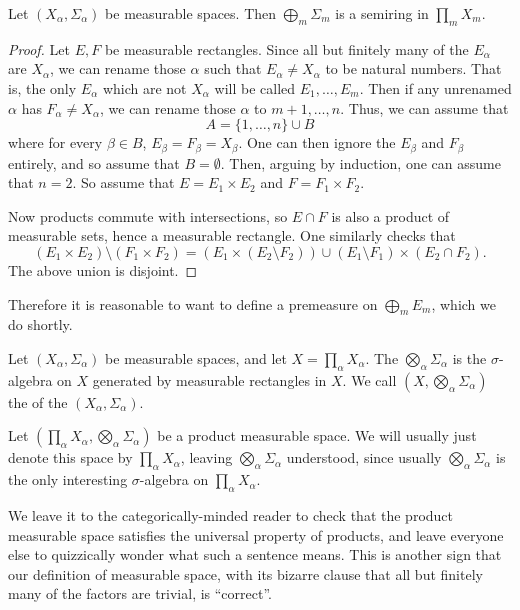 \begin{lemma}
Let $(X_\alpha, \Sigma_\alpha)$ be measurable spaces.
Then $\bigoplus_{m} \Sigma_{m}$ is a semiring in $\prod_{m} X_{m}$.
\end{lemma}
\begin{proof}
Let $E, F$ be measurable rectangles.
Since all but finitely many of the $E_\alpha$ are $X_\alpha$, we can rename those $\alpha$ such that $E_{\alpha} \neq X_\alpha$ to be natural numbers.
That is, the only $E_\alpha$ which are not $X_\alpha$ will be called $E_1, \dots, E_{m}$.
Then if any unrenamed $\alpha$ has $F_{\alpha} \neq X_\alpha$, we can rename those $\alpha$ to $m+1, \dots, n$.
Thus, we can assume that
\[A = \{1, \dots, n\} \cup B\]
where for every $\beta \in B$, $E_{\beta} = F_{\beta} = X_\beta$.
One can then ignore the $E_\beta$ and $F_\beta$ entirely, and so assume that $B = \emptyset$.
Then, arguing by induction, one can assume that $n = 2$.
So assume that $E = E_1 \times E_2$ and $F = F_1 \times F_2$.

Now products commute with intersections, so $E \cap F$ is also a product of measurable sets, hence a measurable rectangle.
One similarly checks that
\[(E_1 \times E_2) \setminus (F_1 \times F_2) = (E_1 \times (E_2 \setminus F_2)) \cup (E_1 \setminus F_1) \times (E_2 \cap F_2).\]
The above union is disjoint.
\end{proof}

Therefore it is reasonable to want to define a premeasure on $\bigoplus_{m} E_{m}$, which we do shortly.

\begin{definition}
Let $(X_\alpha, \Sigma_\alpha)$ be measurable spaces, and let $X = \prod_{\alpha} X_\alpha$.
The  $\bigotimes_{\alpha} \Sigma_\alpha$ is the $\sigma$-algebra on $X$ generated by measurable rectangles in $X$.
We call $(X, \bigotimes_{\alpha} \Sigma_\alpha)$ the  of the $(X_\alpha, \Sigma_\alpha)$.
\end{definition}

Let $(\prod_{\alpha} X_\alpha, \bigotimes_{\alpha} \Sigma_\alpha)$ be a product measurable space. We will usually just denote this space by $\prod_{\alpha} X_\alpha$, leaving $\bigotimes_{\alpha} \Sigma_\alpha$ understood, since usually $\bigotimes_{\alpha} \Sigma_\alpha$ is the only interesting $\sigma$-algebra on $\prod_{\alpha} X_\alpha$.

We leave it to the categorically-minded reader to check that the product measurable space satisfies the universal property of products, and leave everyone else to quizzically wonder what such a sentence means.
This is another sign that our definition of measurable space, with its bizarre clause that all but finitely many of the factors are trivial, is ``correct''.


